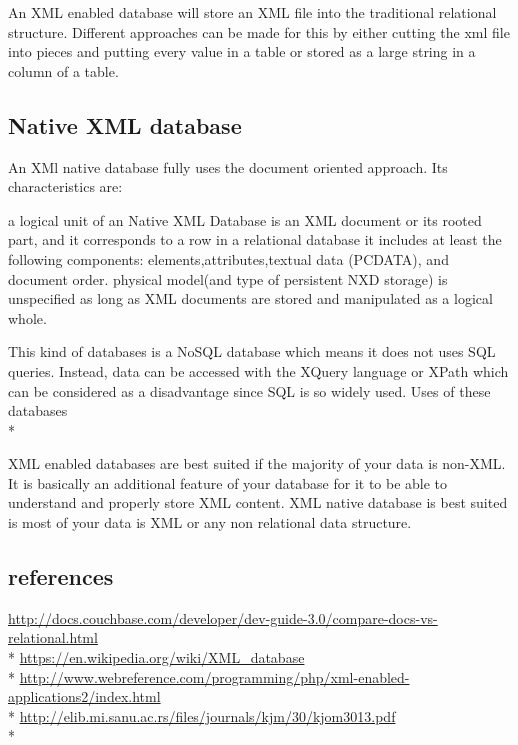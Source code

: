 An XML enabled database will store an XML file into the traditional relational structure. Different approaches can be made for this by either cutting the xml file into pieces and putting every value in a table or stored as a large string in a column of a table.
\subsection{Native XML database}

An XMl native database fully uses the document oriented approach. Its characteristics are:

    a logical unit of an Native XML Database is an XML document or its rooted part, and it corresponds to a row in a relational database
    it includes at least the following components: elements,attributes,textual data (PCDATA), and document order.
    physical model(and type of persistent NXD storage) is unspecified as long as XML documents are stored and manipulated as a logical whole.

This kind of databases is a NoSQL database which means it does not uses SQL queries. Instead, data can be accessed with the XQuery language or XPath which can be considered as a disadvantage since SQL is so widely used.
Uses of these databases\\* \cite{ref4}


XML enabled databases are best suited if the majority of your data is non-XML. It is basically an additional feature of your database for it to be able to understand and properly store XML content. XML native database is best suited is most of your data is XML or any non relational data structure.
\subsection{references}


\textcolor{blue}{\url{ http://docs.couchbase.com/developer/dev-guide-3.0/compare-docs-vs-relational.html}}\\*
\textcolor{blue}{\url{ https://en.wikipedia.org/wiki/XML_database}}\\*
\textcolor{blue}{\url{ http://www.webreference.com/programming/php/xml-enabled-applications2/index.html}}\\*
\textcolor{blue}{\url{ http://elib.mi.sanu.ac.rs/files/journals/kjm/30/kjom3013.pdf}}\\*


